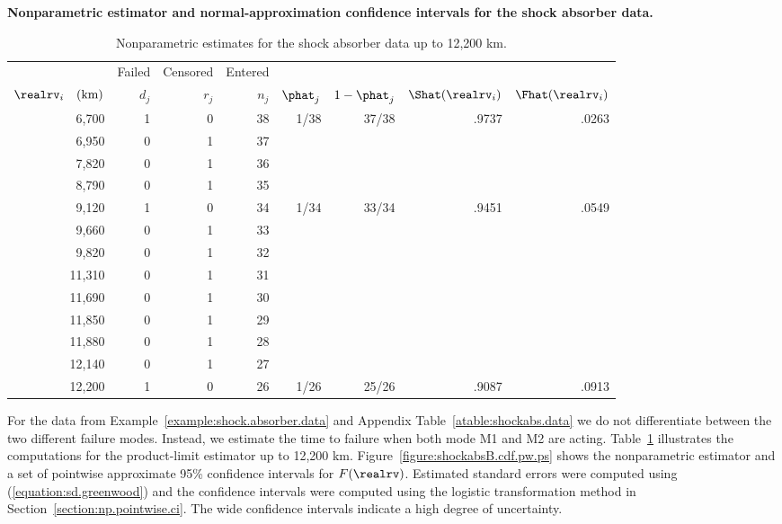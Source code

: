 \begin{example}
\label{example:shock.absorber.cdfest}
{\bf Nonparametric estimator and normal-approximation confidence
intervals for the shock absorber data.} 
\begin{table}[htb]
\caption{Nonparametric estimates 
for the shock absorber data up to 12,200 km.}
\centering\small
\begin{tabular}{*{8}{r}}
\\[-1.0ex]
\hline
& \multicolumn{1}{c}{Failed} & \multicolumn{1}{c}{Censored} & \multicolumn{1}{c}{Entered}&\\
\cline{2-4}
 $\realrv_{i} \quad \mbox{(km)}$ & $d_{j}$ & $r_{j}$ & $n_{j}$ & $\phat_{j}$ & $1-\phat_{j}$
& $\Shat(\realrv_{i})$ & $\Fhat(\realrv_{i})$ \\[.8ex]
\hline
 6,700   & 1 & 0  & 38 & 1/38  & 37/38  & .9737 & .0263 \\ 
 6,950   & 0 & 1  & 37 &       &       &       &  \\ 
 7,820   & 0 & 1  & 36 &       &       &       &  \\ 
 8,790   & 0 & 1  & 35 &       &       &       &  \\ 
 9,120   & 1 & 0  & 34 & 1/34  & 33/34 & .9451  & .0549 \\ 
 9,660   & 0 & 1  & 33 &       &       &       &  \\ 
 9,820   & 0 & 1  & 32 &       &       &       &  \\ 
11,310   & 0 & 1  & 31 &       &       &       &  \\ 
11,690   & 0 & 1  & 30 &       &       &       &  \\ 
11,850   & 0 & 1  & 29 &       &       &       &  \\ 
11,880   & 0 & 1  & 28 &       &       &       &  \\ 
12,140   & 0 & 1  & 27 &       &       &       &  \\ 
12,200   & 1 & 0  & 26 & 1/26  &  25/26& .9087  & .0913 \\ 
\hline
\end{tabular}
\label{table:pl.shockabs}
\end{table}
For the data from
Example~\ref{example:shock.absorber.data} and Appendix
Table~\ref{atable:shockabs.data} we do not
differentiate between the two different failure modes. Instead, we
estimate the time to failure when both mode M1 and M2 are acting.
Table~\ref{table:pl.shockabs} illustrates the computations for the
product-limit estimator up to 12,200 km.
Figure~\ref{figure:shockabsB.cdf.pw.ps} shows the nonparametric
estimator and a set of pointwise approximate 95\% confidence
intervals for $F(\realrv)$. Estimated standard errors were computed using
(\ref{equation:sd.greenwood}) and the confidence intervals were
computed using the logistic transformation method in
Section~\ref{section:np.pointwise.ci}. The wide confidence
intervals indicate a high degree of uncertainty.
\end{example}

